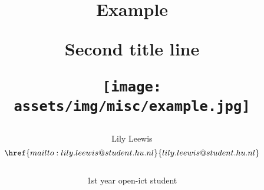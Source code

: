 \title{ %
    Example \par
    Second title line \par
    \texttt{[image: assets/img/misc/example.jpg]} %
}
\def\pdftitlevar{Example title} %
\def\pdfsubjectvar{PDF Subject} %
\def\languagevar{english} %


\author{
    Lily Leewis\\ %
    $$\href{mailto:lily.leewis@student.hu.nl}{lily.leewis@student.hu.nl}$$\\ %
    1st year open-ict student\\ %
    \newline
}
\def\citationvar{ieee} %
\def\lheadvar{L. Leewis(1858379)} %
\def\pdfauthorvar{Lily Leewis lily.leewis@student.hu.nl} %

